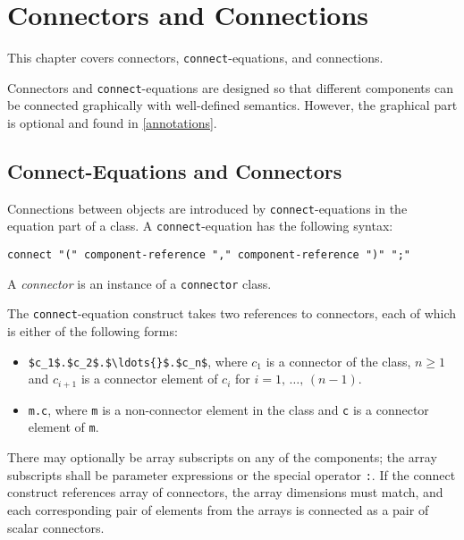 \chapter{Connectors and Connections}\label{connectors-and-connections}

This chapter covers connectors, \lstinline!connect!-equations, and connections.

Connectors and \lstinline!connect!-equations are designed so that different components can be connected graphically with well-defined semantics.
However, the graphical part is optional and found in \cref{annotations}.

\section{Connect-Equations and Connectors}\label{connect-equations-and-connectors}

Connections between objects are introduced by \lstinline!connect!-equations in the equation part of a class.
A \lstinline!connect!-equation has the following syntax:
\begin{lstlisting}[language=grammar]
connect "(" component-reference "," component-reference ")" ";"
\end{lstlisting}

\begin{nonnormative}
A \emph{connector} is an instance of a \lstinline!connector! class.
\end{nonnormative}

The \lstinline!connect!-equation construct takes two references to connectors, each of which is either of the following forms:
\begin{itemize}
\item
  \lstinline!$c_1$.$c_2$.$\ldots{}$.$c_n$!, where $c_1$ is a connector of the class, $n \geq 1$ and $c_{i+1}$ is a connector element of $c_i$ for $i = 1,\, \ldots,\, (n - 1)$.
\item
  \lstinline!m.c!, where \lstinline!m! is a non-connector element in the class and \lstinline!c! is a connector element of \lstinline!m!.
\end{itemize}

There may optionally be array subscripts on any of the components; the array subscripts shall be parameter expressions or the special operator \lstinline!:!.
If the connect construct references array of connectors, the array dimensions must match, and each corresponding pair of elements from the arrays is connected as a pair of scalar connectors.


